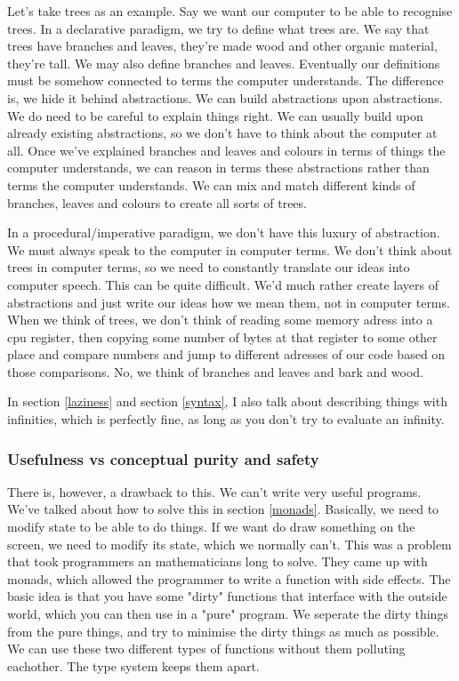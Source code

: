 \documentclass[11pt]{article}
\begin{document}
Let's take trees as an example. Say we want our computer to be able to
recognise trees. In a declarative paradigm, we try to define what trees are. We
say that trees have branches and leaves, they're made wood and other organic
material, they're tall. We may also define branches and leaves. Eventually our
definitions must be somehow connected to terms the computer understands. The
difference is, we hide it behind abstractions. We can build abstractions upon
abstractions. We do need to be careful to explain things right. We can usually
build upon already existing abstractions, so we don't have to think about the
computer at all. Once we've explained branches and leaves and colours in terms
of things the computer understands, we can reason in terms these abstractions
rather than terms the computer understands.  We can mix and match different
kinds of branches, leaves and colours to create all sorts of trees.

In a procedural/imperative paradigm, we don't have this luxury of abstraction.
We must always speak to the computer in computer terms. We don't think about
trees in computer terms, so we need to constantly translate our ideas into
computer speech. This can be quite difficult. We'd much rather create layers of
abstractions and just write our ideas how we mean them, not in computer terms.
When we think of trees, we don't think of reading some memory adress into a cpu
register, then copying some number of bytes at that register to some other
place and compare numbers and jump to different adresses of our code based on
those comparisons. No, we think of branches and leaves and bark and wood.

In section \ref{laziness} and section \ref{syntax}, I also talk about
describing things with infinities, which is perfectly fine, as long as you
don't try to evaluate an infinity.

\subsubsection{Usefulness vs conceptual purity and safety}\label{usefulness}

There is, however, a drawback to this. We can't write very useful programs.
We've talked about how to solve this in section \ref{monads}. Basically, we
need to modify state to be able to do things. If we want do draw something on
the screen, we need to modify its state, which we normally can't. This was a
problem that took programmers an mathematicians long to solve. They came up
with monads, which allowed the programmer to write a function with side
effects. The basic idea is that you have some "dirty" functions that interface
with the outside world, which you can then use in a "pure" program. We seperate
the dirty things from the pure things, and try to minimise the dirty things as
much as possible. We can use these two different types of functions without
them polluting eachother. The type system keeps them apart.
\end{document}
